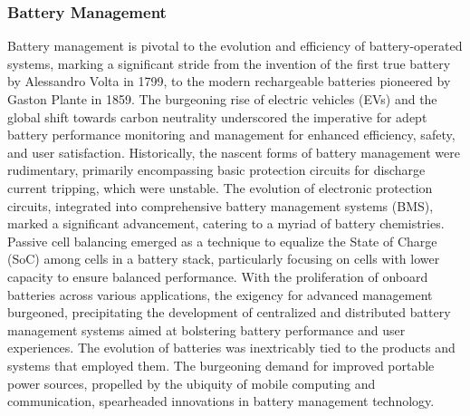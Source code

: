 \subsubsection{Battery Management}\label{subsec:BM}
Battery management is pivotal to the evolution and efficiency of battery-operated systems, marking a significant stride from the invention of the first true battery by Alessandro Volta in 1799, to the modern rechargeable batteries pioneered by Gaston Plante in 1859\cite{1}. The burgeoning rise of electric vehicles (EVs) and the global shift towards carbon neutrality underscored the imperative for adept battery performance monitoring and management for enhanced efficiency, safety, and user satisfaction\cite{2}.\newline\newline
\noindent
Historically, the nascent forms of battery management were rudimentary, primarily encompassing basic protection circuits for discharge current tripping, which were unstable. The evolution of electronic protection circuits, integrated into comprehensive battery management systems (BMS), marked a significant advancement, catering to a myriad of battery chemistries\cite{3}. Passive cell balancing emerged as a technique to equalize the State of Charge (SoC) among cells in a battery stack, particularly focusing on cells with lower capacity to ensure balanced performance\cite{4}.\newline\newline
\noindent
With the proliferation of onboard batteries across various applications, the exigency for advanced management burgeoned, precipitating the development of centralized and distributed battery management systems aimed at bolstering battery performance and user experiences\cite{5}. The evolution of batteries was inextricably tied to the products and systems that employed them. The burgeoning demand for improved portable power sources, propelled by the ubiquity of mobile computing and communication, spearheaded innovations in battery management technology\cite{6}.
